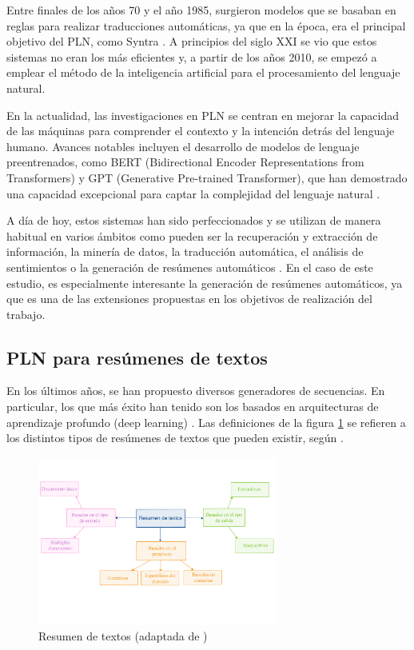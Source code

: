 Entre finales de los años 70 y el año 1985, surgieron modelos que se basaban en reglas para realizar traducciones automáticas, ya que en la época, era el principal objetivo del PLN, como Syntra \citep{Toma1970SYSTRANMT}. A principios del siglo XXI se vio que estos sistemas no eran los más eficientes y, a partir de los años 2010, se empezó a emplear el método de la inteligencia artificial para el procesamiento del lenguaje natural.

En la actualidad, las investigaciones en PLN se centran en mejorar la capacidad de las máquinas para comprender el contexto y la intención detrás del lenguaje humano. Avances notables incluyen el desarrollo de modelos de lenguaje preentrenados, como BERT (Bidirectional Encoder Representations from Transformers) y GPT (Generative Pre-trained Transformer), que han demostrado una capacidad excepcional para captar la complejidad del lenguaje natural \citep{devlin2019bert}.

A día de hoy, estos sistemas han sido perfeccionados y se utilizan de manera habitual en varios ámbitos como pueden ser la recuperación y extracción de información, la minería de datos, la traducción automática, el análisis de sentimientos o la generación de resúmenes automáticos \citep{hernandez2013aplicaciones}. En el caso de este estudio, es especialmente interesante la generación de resúmenes automáticos, ya que es una de las extensiones propuestas en los objetivos de realización del trabajo.

\subsection{PLN para resúmenes de textos}

En los últimos años, se han propuesto diversos generadores de secuencias. En particular, los que más éxito han tenido son los basados en arquitecturas de aprendizaje profundo (deep learning) \citep{mishra2020deep}. Las definiciones de la figura \ref{fig:resumenTextos} se refieren a los distintos tipos de resúmenes de textos que pueden existir, según \cite{adhikari2020nlp}. 

\begin{figure}[h]
	\centering
	\includegraphics[width = 0.7\textwidth]{Imagenes/Vectorial/resumenTextos.pdf}
	\caption{Resumen de textos (adaptada de \cite{adhikari2020nlp})}
	\label{fig:resumenTextos}
\end{figure}

